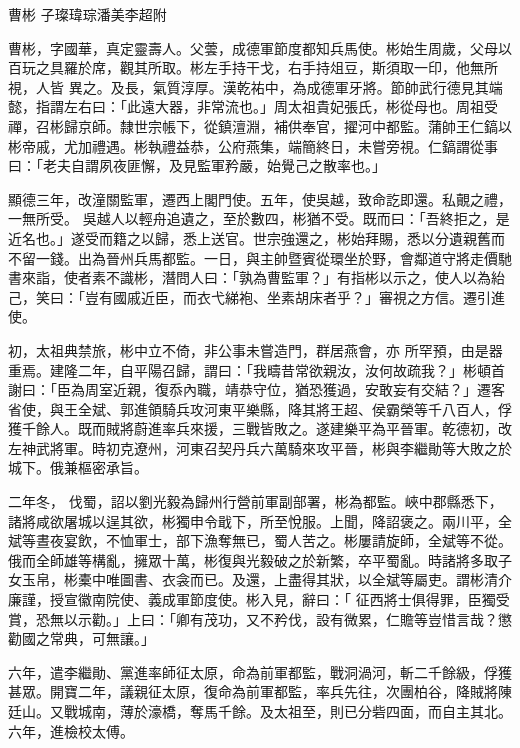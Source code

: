 
\begin{pinyinscope}

 曹彬
 子璨瑋琮潘美李超附



 曹彬，字國華，真定靈壽人。父蕓，成德軍節度都知兵馬使。彬始生周歲，父母以百玩之具羅於席，觀其所取。彬左手持干戈，右手持俎豆，斯須取一印，他無所視，人皆
 異之。及長，氣質淳厚。漢乾祐中，為成德軍牙將。節帥武行德見其端懿，指謂左右曰：「此遠大器，非常流也。」周太祖貴妃張氏，彬從母也。周祖受禪，召彬歸京師。隸世宗帳下，從鎮澶淵，補供奉官，擢河中都監。蒲帥王仁鎬以彬帝戚，尤加禮遇。彬執禮益恭，公府燕集，端簡終日，未嘗旁視。仁鎬謂從事曰：「老夫自謂夙夜匪懈，及見監軍矜嚴，始覺己之散率也。」



 顯德三年，改潼關監軍，遷西上閣門使。五年，使吳越，致命訖即還。私覿之禮，一無所受。
 吳越人以輕舟追遺之，至於數四，彬猶不受。既而曰：「吾終拒之，是近名也。」遂受而籍之以歸，悉上送官。世宗強還之，彬始拜賜，悉以分遺親舊而不留一錢。出為晉州兵馬都監。一日，與主帥暨賓從環坐於野，會鄰道守將走價馳書來詣，使者素不識彬，潛問人曰：「孰為曹監軍？」有指彬以示之，使人以為紿己，笑曰：「豈有國戚近臣，而衣弋綈袍、坐素胡床者乎？」審視之方信。遷引進使。



 初，太祖典禁旅，彬中立不倚，非公事未嘗造門，群居燕會，亦
 所罕預，由是器重焉。建隆二年，自平陽召歸，謂曰：「我疇昔常欲親汝，汝何故疏我？」彬頓首謝曰：「臣為周室近親，復忝內職，靖恭守位，猶恐獲過，安敢妄有交結？」遷客省使，與王全斌、郭進領騎兵攻河東平樂縣，降其將王超、侯霸榮等千八百人，俘獲千餘人。既而賊將蔚進率兵來援，三戰皆敗之。遂建樂平為平晉軍。乾德初，改左神武將軍。時初克遼州，河東召契丹兵六萬騎來攻平晉，彬與李繼勛等大敗之於城下。俄兼樞密承旨。



 二年冬，
 伐蜀，詔以劉光毅為歸州行營前軍副部署，彬為都監。峽中郡縣悉下，諸將咸欲屠城以逞其欲，彬獨申令戢下，所至悅服。上聞，降詔褒之。兩川平，全斌等晝夜宴飲，不恤軍士，部下漁奪無已，蜀人苦之。彬屢請旋師，全斌等不從。俄而全師雄等構亂，擁眾十萬，彬復與光毅破之於新繁，卒平蜀亂。時諸將多取子女玉帛，彬橐中唯圖書、衣衾而已。及還，上盡得其狀，以全斌等屬吏。謂彬清介廉謹，授宣徽南院使、義成軍節度使。彬入見，辭曰：「
 征西將士俱得罪，臣獨受賞，恐無以示勸。」上曰：「卿有茂功，又不矜伐，設有微累，仁贍等豈惜言哉？懲勸國之常典，可無讓。」



 六年，遣李繼勛、黨進率師征太原，命為前軍都監，戰洞渦河，斬二千餘級，俘獲甚眾。開寶二年，議親征太原，復命為前軍都監，率兵先往，次團柏谷，降賊將陳廷山。又戰城南，薄於濠橋，奪馬千餘。及太祖至，則已分砦四面，而自主其北。六年，進檢校太傅。




\end{pinyinscope}
